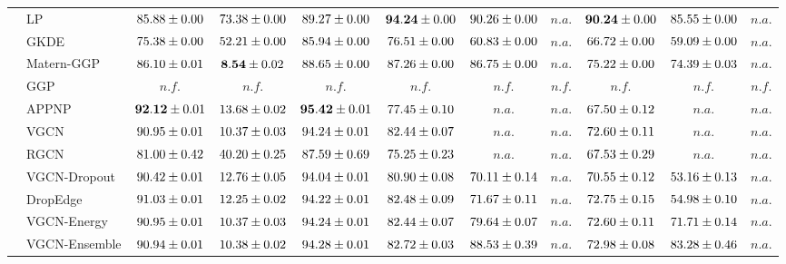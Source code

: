 \begin{table*}[!h]
{\begin{tabular}{ll|cc|cccc|ccc}
        & LP & ${85.88\tiny \pm 0.00}$ & ${73.38\tiny \pm 0.00}$ & ${89.27\tiny \pm 0.00}$ & ${\mathbf{94.24}\tiny \pm 0.00}$ & ${90.26\tiny \pm 0.00}$ & $n.a.$ & ${\mathbf{90.24}\tiny \pm 0.00}$ & ${85.55\tiny \pm 0.00}$ & $n.a.$\\
        & GKDE & ${75.38\tiny \pm 0.00}$ & ${52.21\tiny \pm 0.00}$ & ${85.94\tiny \pm 0.00}$ & ${76.51\tiny \pm 0.00}$ & ${60.83\tiny \pm 0.00}$ & $n.a.$ & ${66.72\tiny \pm 0.00}$ & ${59.09\tiny \pm 0.00}$ & $n.a.$\\
        & Matern-GGP & ${86.10\tiny \pm 0.01}$ & ${\mathbf{8.54}\tiny \pm 0.02}$ & ${88.65\tiny \pm 0.00}$ & ${87.26\tiny \pm 0.00}$ & ${86.75\tiny \pm 0.00}$ & $n.a.$ & ${75.22\tiny \pm 0.00}$ & ${74.39\tiny \pm 0.03}$ & $n.a.$\\
        & GGP & $n.f.$ & $n.f.$ & $n.f.$ & $n.f.$ & $n.f.$ & $n.f.$ & $n.f.$ & $n.f.$ & $n.f.$\\
        & APPNP & ${\mathbf{92.12}\tiny \pm 0.01}$ & ${13.68\tiny \pm 0.02}$ & ${\mathbf{95.42}\tiny \pm 0.01}$ & ${77.45\tiny \pm 0.10}$ & $n.a.$ & $n.a.$ & ${67.50\tiny \pm 0.12}$ & $n.a.$ & $n.a.$\\
        & VGCN & ${90.95\tiny \pm 0.01}$ & ${10.37\tiny \pm 0.03}$ & ${94.24\tiny \pm 0.01}$ & ${82.44\tiny \pm 0.07}$ & $n.a.$ & $n.a.$ & ${72.60\tiny \pm 0.11}$ & $n.a.$ & $n.a.$\\
        & RGCN & ${81.00\tiny \pm 0.42}$ & ${40.20\tiny \pm 0.25}$ & ${87.59\tiny \pm 0.69}$ & ${75.25\tiny \pm 0.23}$ & $n.a.$ & $n.a.$ & ${67.53\tiny \pm 0.29}$ & $n.a.$ & $n.a.$\\
        & VGCN-Dropout & ${90.42\tiny \pm 0.01}$ & ${12.76\tiny \pm 0.05}$ & ${94.04\tiny \pm 0.01}$ & ${80.90\tiny \pm 0.08}$ & ${70.11\tiny \pm 0.14}$ & $n.a.$ & ${70.55\tiny \pm 0.12}$ & ${53.16\tiny \pm 0.13}$ & $n.a.$\\
        & DropEdge & ${91.03\tiny \pm 0.01}$ & ${12.25\tiny \pm 0.02}$ & ${94.22\tiny \pm 0.01}$ & ${82.48\tiny \pm 0.09}$ & ${71.67\tiny \pm 0.11}$ & $n.a.$ & ${72.75\tiny \pm 0.15}$ & ${54.98\tiny \pm 0.10}$ & $n.a.$\\
        & VGCN-Energy & ${90.95\tiny \pm 0.01}$ & ${10.37\tiny \pm 0.03}$ & ${94.24\tiny \pm 0.01}$ & ${82.44\tiny \pm 0.07}$ & ${79.64\tiny \pm 0.07}$ & $n.a.$ & ${72.60\tiny \pm 0.11}$ & ${71.71\tiny \pm 0.14}$ & $n.a.$\\
        & VGCN-Ensemble & ${90.94\tiny \pm 0.01}$ & ${10.38\tiny \pm 0.02}$ & ${94.28\tiny \pm 0.01}$ & ${82.72\tiny \pm 0.03}$ & ${88.53\tiny \pm 0.39}$ & $n.a.$ & ${72.98\tiny \pm 0.08}$ & ${83.28\tiny \pm 0.46}$ & $n.a.$\\

\end{tabular}}
\end{table*}
